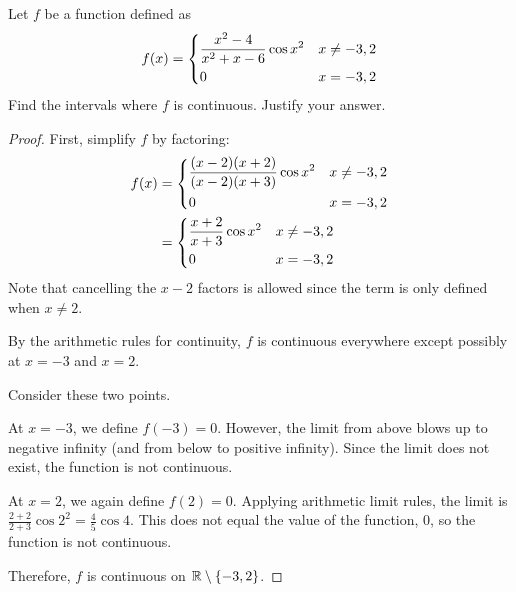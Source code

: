 \documentclass{agony}
\begin{document}
\question Let $f$ be a function defined as
\begin{equation*}
  f(x) = \begin{dcases}
    \frac{x^2-4}{x^2+x-6} \cos x^2 & x \neq -3,2 \\
    0                              & x=-3,2
  \end{dcases}
\end{equation*}
Find the intervals where $f$ is continuous. Justify your answer.
\begin{proof}
  First, simplify $f$ by factoring:
  \begin{align*}
    f(x) & = \begin{dcases}
      \frac{(x-2)(x+2)}{(x-2)(x+3)} \cos x^2 & x \neq -3,2 \\
      0                                      & x=-3,2
    \end{dcases} \\
         & = \begin{dcases}
      \frac{x+2}{x+3} \cos x^2 & x \neq -3,2 \\
      0                        & x=-3,2
    \end{dcases}
  \end{align*}
  Note that cancelling the $x-2$ factors is allowed since the term is only defined when $x\neq 2$.

  By the arithmetic rules for continuity, $f$ is continuous everywhere except possibly at $x=-3$ and $x=2$.

  Consider these two points.

  At $x=-3$, we define $f(-3) = 0$.
  However, the limit from above blows up to negative infinity (and from below to positive infinity).
  Since the limit does not exist, the function is not continuous.

  At $x=2$, we again define $f(2)=0$.
  Applying arithmetic limit rules, the limit is $\frac{2+2}{2+3}\cos 2^2 = \frac{4}{5}\cos 4$.
  This does not equal the value of the function, 0, so the function is not continuous.

  Therefore, $f$ is continuous on $\mathbb{R} \setminus \{-3,2\}$.
\end{proof}
\end{document}
